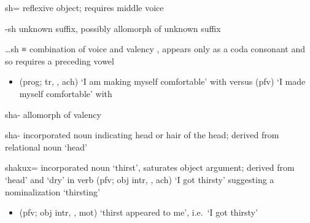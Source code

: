 \begin{morphdesc}[resume*=alphalist]
\item[sh=]\label{m:sh=}
	reflexive object;
	requires middle voice 

\item[-sh]\label{m:-sh}
	unknown suffix, possibly allomorph of unknown suffix 

\item[…sh]\label{m:…sh}
	≡ 
	combination of voice 
		and valency ,
	appears only as a coda consonant and so requires a preceding vowel
	\begin{itemize}
	\item	{} (prog; tr, , ach) ‘I am making myself comfortable’
			with \newline
		versus  (pfv) ‘I made myself comfortable’
			with 
	\end{itemize}

\item[sha-]\label{m:sha-val}
	allomorph of valency 

\item[sha-]
	incorporated noun indicating head or hair of the head;
	derived from relational noun  ‘head’

\item[shakux=]
	incorporated noun ‘thirst’,
	saturates object argument;
	derived from  ‘head’ and  ‘dry’
		in verb  (pfv; obj intr, , ach) ‘I got thirsty’
		suggesting a nominalization  ‘thirsting’
	\begin{itemize}
	\item	{} (pfv; obj intr, , mot) ‘thirst appeared to me’,
		i.e.\ ‘I got thirsty’
		\parencite[01/11]{leer:1973}
	\end{itemize}


\end{morphdesc}
